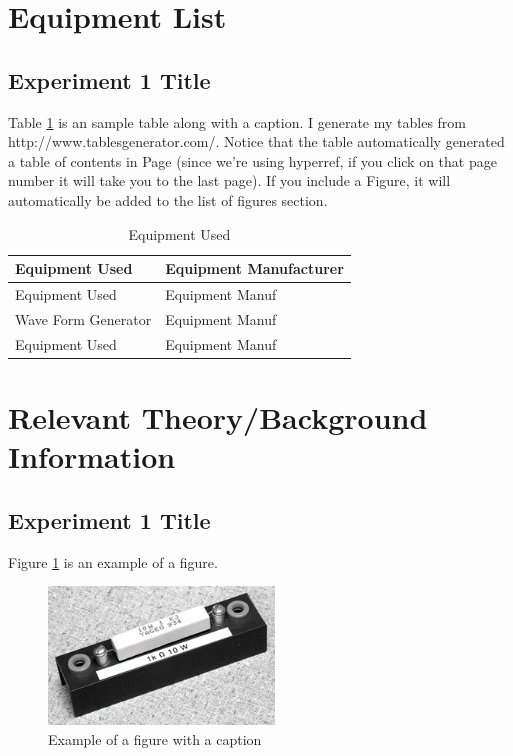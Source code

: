 \documentclass[a4paper]{article}
\begin{document}
\section{Equipment List}
\subsection{Experiment 1 Title}
Table \ref{EquipmentUsed} is an sample table along with a caption. I generate my tables from 
http://www.tablesgenerator.com/. Notice that the table automatically generated a table of contents in Page \pageref{LastPage} (since we're using hyperref, if you click on that page number it will take you to the last page). If you include a Figure, it will automatically be added to the list of figures section.
\begin{table}[ht]
	\centering
	\caption{Equipment Used} %
	\label{EquipmentUsed}
	\begin{tabular}{|l||l|}
		\hline
		\textbf{Equipment Used}       & \textbf{Equipment Manufacturer}               \\
		\hline
		Equipment Used & Equipment Manuf                         \\
		\hline
		Wave Form Generator  & Equipment Manuf                       \\
		\hline
		Equipment Used         & Equipment Manuf \\
		\hline
	\end{tabular}
		
\end{table}


\section{Relevant Theory/Background Information}
\subsection{Experiment 1 Title}
\lipsum[1]
Figure \ref{fig1} is an example of a figure.
\begin{figure}[H]\label{fig1}
	\begin{center}
		\includegraphics[width=6cm]{fig.png}
	\end{center}
	\caption{Example of a figure with a caption}
\end{figure}
\end{document}
